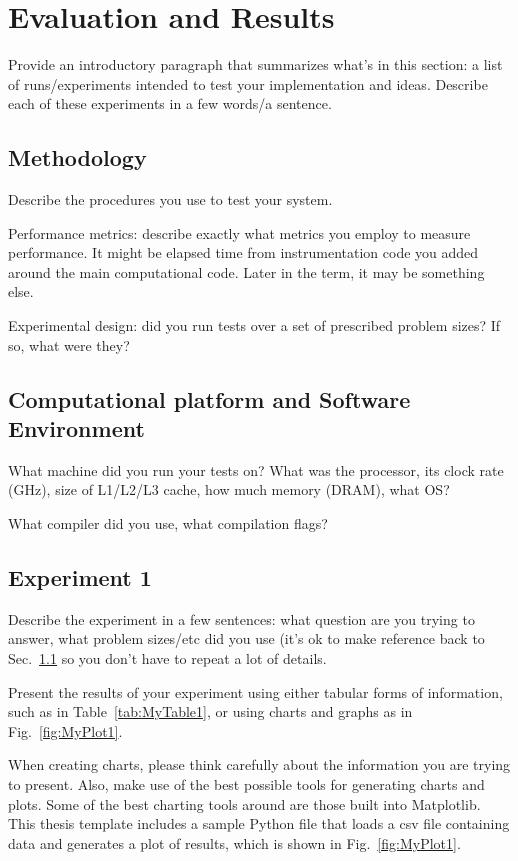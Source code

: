 \chapter{Evaluation and Results}

Provide an introductory paragraph that summarizes what's in this section: a list of runs/experiments intended to test your implementation and ideas. Describe each of these experiments in a few words/a sentence.

\section{Methodology}
\label{sec:methodology}

Describe the procedures you use to test your system.

Performance metrics: describe exactly what metrics you employ to measure performance. It might be elapsed time from instrumentation code you added around the main computational code. Later in the term, it may be something else.

Experimental design: did you run tests over a set of prescribed problem sizes? If so, what were they?

\section{Computational platform and Software Environment}

What machine did you run your tests on? What was the processor, its clock rate (GHz), size of L1/L2/L3 cache, how much memory (DRAM), what OS?

What compiler did you use, what compilation flags?

\section{Experiment 1}

Describe the experiment in a few sentences: what question are you trying to answer, what problem sizes/etc did you use (it's ok to make reference back to Sec.~\ref{sec:methodology} so you don't have to repeat a lot of details.

Present the results of your experiment using either tabular forms of information, such as in Table~\ref{tab:MyTable1}, or using charts and graphs as in Fig.~\ref{fig:MyPlot1}.

When creating charts, please think carefully about the information you are trying to present. Also, make use of the best possible tools for generating charts and plots. Some of the best charting tools around are those built into Matplotlib. This thesis template includes a sample Python file that loads a csv file containing data and generates a plot of results, which is shown in Fig.~\ref{fig:MyPlot1}.

